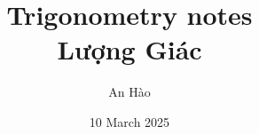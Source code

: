 \RequirePackage{standalone}

\usepackage[utf8]{inputenc}
\usepackage[T1]{fontenc}

\usepackage{blindtext} %

\usepackage{amsmath}
\usepackage{amsthm}

\usepackage{graphicx}
\usepackage{subcaption}
\graphicspath{ {./figures/} {./figures/img/} }


\usepackage{tikz}


\usepackage[left=1.35in, right=1.35in, top=1.0in, bottom=.9in, headsep=.2in, footskip=0.35in]{geometry}

\renewcommand{\baselinestretch}{1.2}

\setlength{\parskip}{1.3mm}

\usepackage[vietnamese=nohyphenation]{hyphsubst} %
\usepackage[vietnamese]{babel}

\usepackage{hyperref} %
    


\title{
	{Trigonometry notes}\\
	{\large Lượng Giác}\\
}
\author{An Hào}
\date{10 March 2025}